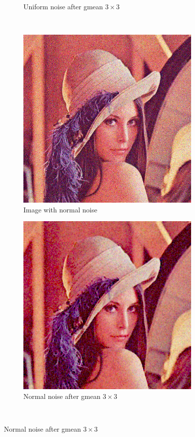 \documentclass[12pt]{article}
\theoremstyle{definition}
\begin{document}
\begin{figure}[ht]
\begin{subfigure}[t]{.4\textwidth}
        \caption{Uniform noise after gmean $3\times3$}
    \end{subfigure}\\[2em]
    \begin{subfigure}[t]{.4\textwidth}\centering
        \includegraphics[width=.8\textwidth]{lenac_normal3}
        \caption{Image with normal noise}
    \end{subfigure}
    \begin{subfigure}[t]{.4\textwidth}\centering
        \includegraphics[width=.8\textwidth]{lenac_normal_gmean}
        \caption{Normal noise after gmean $3\times3$}
    \end{subfigure}\\[2em]

\end{figure}
\end{document}
